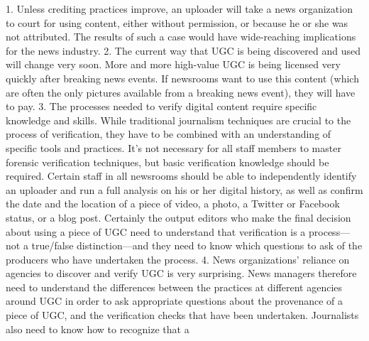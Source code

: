 \begin{enumerate}
1. Unless crediting practices improve, an uploader will take a news
organization to court for using content, either without permission,
or because he or she was not attributed. The results of such a case
would have wide-reaching implications for the news industry.
2. The current way that UGC is being discovered and used will change
very soon. More and more high-value UGC is being licensed very
quickly after breaking news events. If newsrooms want to use this
content (which are often the only pictures available from a breaking
news event), they will have to pay.
3. The processes needed to verify digital content require specific
knowledge and skills. While traditional journalism techniques are
crucial to the process of verification, they have to be combined with
an understanding of specific tools and practices. It's not necessary
for all staff members to master forensic verification techniques, but
basic verification knowledge should be required. Certain staff in all
newsrooms should be able to independently identify an uploader and
run a full analysis on his or her digital history, as well as confirm
the date and the location of a piece of video, a photo, a Twitter or
Facebook status, or a blog post. Certainly the output editors who
make the final decision about using a piece of UGC need to understand
that verification is a process—not a true/false distinction—and
they need to know which questions to ask of the producers who have
undertaken the process.
4. News organizations' reliance on agencies to discover and verify
UGC is very surprising. News managers therefore need to understand
the differences between the practices at different agencies
around UGC in order to ask appropriate questions about the provenance
of a piece of UGC, and the verification checks that have been
undertaken. Journalists also need to know how to recognize that a


\end{enumerate}

